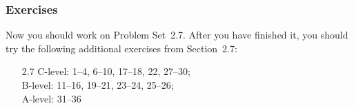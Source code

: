 \documentclass[serif,ignorenonframetext]{beamer}
\begin{document}
\begin{frame}
  \frametitle{Exercises}
  Now you should work on Problem Set~2.7.  After you have finished it,
  you should try the following additional exercises from Section~2.7:
  \begin{itemize}
  \item[2.7] C-level: 1--4, 6--10, 17--18, 22, 27--30; \\
    B-level: 11--16, 19--21, 23--24, 25--26; \\
    A-level: 31--36
  \end{itemize}
\end{frame}
\end{document}
